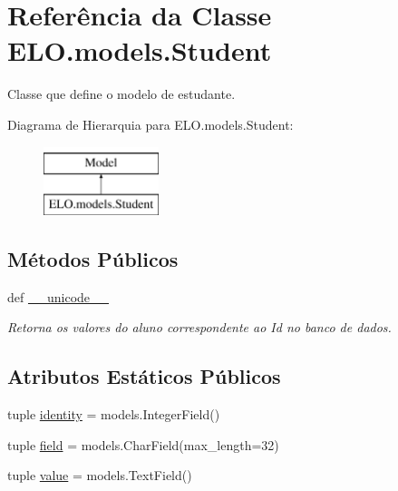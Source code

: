 \hypertarget{classELO_1_1models_1_1Student}{\section{Referência da Classe E\-L\-O.\-models.\-Student}
\label{classELO_1_1models_1_1Student}
}


Classe que define o modelo de estudante.  


Diagrama de Hierarquia para E\-L\-O.\-models.\-Student\-:\begin{figure}[H]
\begin{center}
\leavevmode
\includegraphics[height=2.000000cm]{d0/dc8/classELO_1_1models_1_1Student}
\end{center}
\end{figure}
\subsection*{Métodos Públicos}
\begin{DoxyCompactItemize}
\item 
def \hyperlink{classELO_1_1models_1_1Student_a2f51785c1beb3b45269a8678d97ec783}{\-\_\-\-\_\-unicode\-\_\-\-\_\-}
\begin{DoxyCompactList}\small\item\em Retorna os valores do aluno correspondente ao Id no banco de dados. \end{DoxyCompactList}\end{DoxyCompactItemize}
\subsection*{Atributos Estáticos Públicos}
\begin{DoxyCompactItemize}
\item 
tuple \hyperlink{classELO_1_1models_1_1Student_a20a7789a2b0f5b7d0c98453dcf38bc4e}{identity} = models.\-Integer\-Field()
\item 
tuple \hyperlink{classELO_1_1models_1_1Student_a893ec9b2ece5c6b829fce5e5a7c1d576}{field} = models.\-Char\-Field(max\-\_\-length=32)
\item 
tuple \hyperlink{classELO_1_1models_1_1Student_a201226779dce6e064cb16bd92ed016e2}{value} = models.\-Text\-Field()
\end{DoxyCompactItemize}


